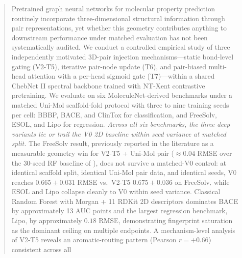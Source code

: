 

\begin{abstract}
Pretrained graph neural networks for molecular property prediction
routinely incorporate three-dimensional structural information through
pair representations, yet whether this geometry contributes anything to
downstream performance under matched evaluation has not been
systematically audited. We conduct a controlled empirical study of three
independently motivated 3D-pair injection mechanisms---static bond-level
gating (V2-T5), iterative pair-node update (T6), and pair-biased
multi-head attention with a per-head sigmoid gate (T7)---within a shared
ChebNet II spectral backbone trained with NT-Xent contrastive
pretraining. We evaluate on six MoleculeNet-derived benchmarks under a
matched Uni-Mol scaffold-fold protocol with three to nine training seeds
per cell: BBBP, BACE, and ClinTox for classification, and FreeSolv,
ESOL, and Lipo for regression. \emph{Across all six benchmarks, the
three deep variants tie or trail the V0 2D baseline within seed
variance at matched split.} The FreeSolv result, previously reported in
the literature as a measurable geometry win for V2-T5 + Uni-Mol pair
($\approx 0.04$ RMSE over the 30-seed RF baseline of
\citet{deng2023systematic}), does not survive a matched-V0 control: at
identical scaffold split, identical Uni-Mol pair data, and identical
seeds, V0 reaches $0.665 \pm 0.031$ RMSE vs.\ V2-T5
$0.675 \pm 0.036$ on FreeSolv, while ESOL and Lipo collapse cleanly to
V0 within seed variance. Classical Random Forest with Morgan + 11
RDKit 2D descriptors dominates BACE by approximately 13 AUC points and
the largest regression benchmark, Lipo, by approximately $0.18$ RMSE,
demonstrating fingerprint saturation as the dominant ceiling on
multiple endpoints. A mechanism-level analysis of V2-T5 reveals an
aromatic-routing pattern (Pearson $r{=}{+}0.66$) consistent across all

\end{abstract}
